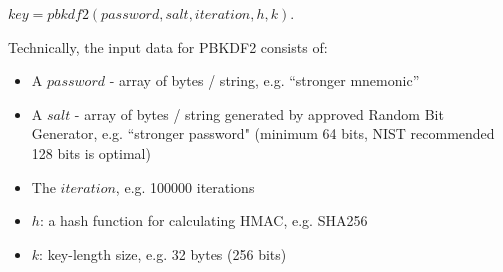 \begin{center}
  $key = pbkdf2(password, salt, iteration, h, k)$.
\end{center}

Technically, the input data for PBKDF2 consists of:

\begin{itemize}
  \item A $password$ - array of bytes / string, e.g. “stronger mnemonic”
  \item A $salt$ - array of bytes / string generated by approved Random Bit Generator, e.g. ``stronger password" (minimum 64 bits, NIST recommended 128 bits is optimal)
  \item The $iteration$, e.g. 100000 iterations
  \item $h$: a hash function for calculating HMAC, e.g. SHA256
  \item $k$: key-length size, e.g. 32 bytes (256 bits)
\end{itemize}



